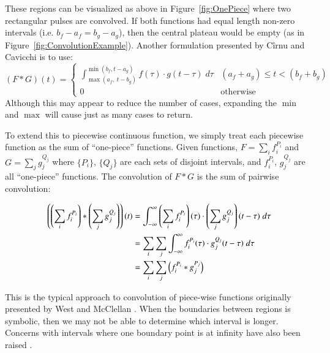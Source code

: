 These regions can be visualized as above in Figure~\ref{fig:OnePiece} where two rectangular pulses are convolved. 
If both functions had equal length non-zero intervals (i.e. $b_f-a_f = b_g-a_g$), then the central plateau would be empty
(as in Figure~\ref{fig:ConvolutionExample}).
Another formulation presented by C\^{i}rnu \cite{cirnu2012calculation} and Cavicchi \cite{cavicchi2002simplified} is to use:
\begin{equation}
	\label{eqn:ConvCirnu}
	(F*G)(t)=
	\begin{cases}
		\int_{\max(a_f, \; t-b_g)}^{\min(b_f, t-a_g)} f(\tau)\cdot g(t-\tau)\; d\tau & (a_f+a_g) \leq t < (b_f+b_g) \\
		0 & \text{otherwise}
	\end{cases}
\end{equation}
Although this may appear to reduce the number of cases, expanding the $\min$ and $\max$ will cause just as many 
cases to return.


To extend this to piecewise continuous function, 
we simply treat each piecewise function as the sum of ``one-piece'' functions.
Given functions, $F= \sum_i f_i^{P_i}$ and $G= \sum_j g_j^{Q_j}$ 
where $\{P_i\}$, $\{Q_j\}$ are each sets of disjoint intervals, and $f_i^{P_i}$, $g_j^{Q_j}$ are all ``one-piece'' functions.
The convolution of $F*G$ is the sum of pairwise convolution:

\begin{align}
	\label{eqn:ConvPiecewise}
	\left(\left(\sum_i f_i^{P_i}\right) * \left(\sum_j g_j^{Q_j}\right)\right) (t)
	&= \int_{-\infty}^\infty \left(\sum_i f_i^{P_i}\right)(\tau)\cdot \left(\sum_j g_j^{Q_j}\right)(t-\tau) \;d\tau
	\notag\\&= \sum_i \sum_j \int_{-\infty}^\infty f_i^{P_i}(\tau) \cdot g_j^{Q_j}(t-\tau) \;d\tau 
	\notag\\&= \sum_i \sum_j \left(f_i^{P_i} * g_j^{P_j}\right)
\end{align}


This is the typical approach to convolution of piece-wise functions originally presented by West and McClellan 
\cite{west1993symbolic}.
When the boundaries between regions is symbolic, then we may not be able to determine which interval is longer.
Concerns with intervals where one boundary point is at infinity have also been raised \cite{evans1994algorithms}.








%
%
